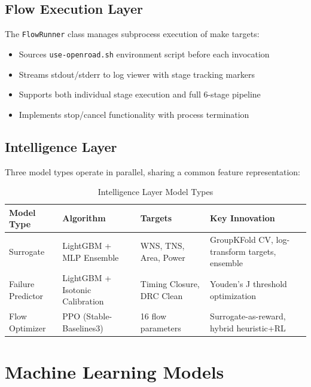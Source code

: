 \documentclass[10pt,conference]{IEEEtran}
\newcommand{\ORFS}{\text{ORFS}}
\begin{document}
\subsection{Flow Execution Layer}

The \texttt{FlowRunner} class manages subprocess execution of \ORFS{} make targets:
\begin{itemize}
    \item Sources \texttt{use-openroad.sh} environment script before each invocation
    \item Streams stdout/stderr to log viewer with stage tracking markers
    \item Supports both individual stage execution and full 6-stage pipeline
    \item Implements stop/cancel functionality with process termination
\end{itemize}

\subsection{Intelligence Layer}

Three model types operate in parallel, sharing a common feature representation:

\begin{table}[t]
\centering
\caption{Intelligence Layer Model Types}
\label{tab:model_types}
\begin{tabular}{@{}llll@{}}
\toprule
Model Type & Algorithm & Targets & Key Innovation \\
\midrule
Surrogate & LightGBM + MLP Ensemble & WNS, TNS, Area, Power & GroupKFold CV, log-transform targets, ensemble \\
Failure Predictor & LightGBM + Isotonic Calibration & Timing Closure, DRC Clean & Youden's J threshold optimization \\
Flow Optimizer & PPO (Stable-Baselines3) & 16 flow parameters & Surrogate-as-reward, hybrid heuristic+RL \\
\bottomrule
\end{tabular}
\end{table}


\section{Machine Learning Models}
\label{sec:ml_models}
\end{document}
